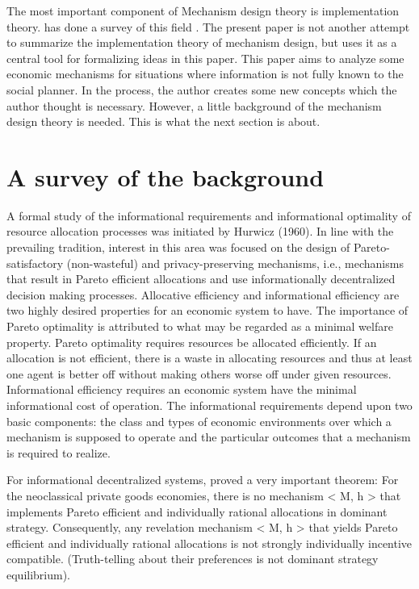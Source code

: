  The most important
component of Mechanism design theory is implementation
theory. \parencite{Liang2010} has done a survey of this field
.  The present paper is not another attempt to summarize the
implementation theory of mechanism design, but uses it as  a central tool for formalizing ideas
in this paper. This paper aims  to analyze some
economic mechanisms for situations where information  is not
fully known to the social planner. In the process, the author creates some new
concepts which the author thought is necessary. However, a little
background of the mechanism design theory is needed. This is what the next
section is about.

\section{A survey of the background}

A formal study of the informational requirements and informational optimality of resource
allocation processes was initiated by Hurwicz (1960).  In line with the prevailing tradition, interest in this area was focused
on the design of Pareto-satisfactory (non-wasteful) and privacy-preserving mechanisms, i.e.,
mechanisms that result in Pareto efficient allocations and use informationally decentralized
decision making processes.  Allocative efficiency and informational efficiency are two highly
desired properties for an economic system to have.  The importance of Pareto optimality is
attributed to what may be regarded as a minimal welfare property. Pareto optimality requires
resources be allocated efficiently. If an allocation is not efficient, there is a waste in allocating
resources and thus at least one agent is better off without making others worse off under given
resources. Informational efficiency requires an economic system have the minimal informational
cost of operation. The informational requirements depend upon two basic components: the class
and types of economic environments over which a mechanism is supposed to operate and the
particular outcomes that a mechanism is required to realize.

For informational decentralized systems, \parencite{Hurwicz1972}
proved a very important theorem: For the neoclassical private goods economies, there is no mechanism < M, h > that implements Pareto efficient
and individually rational allocations in dominant strategy. Consequently, any revelation
mechanism < M, h > that yields Pareto efficient and individually rational allocations is
not strongly individually incentive compatible. (Truth-telling about their preferences is not dominant strategy equilibrium).


